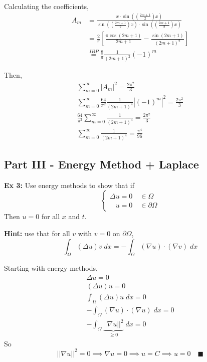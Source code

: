 \documentclass[12pt]{article}
\begin{document}
Calculating the coefficients, 
\begin{align*}
    A_m &= \frac{x \cdot \sin\left(\left(\frac{2m + 1}{2}\right)x\right)}{\sin\left(\left(\frac{2m + 1}{2}\right)x\right) \cdot \sin\left(\left(\frac{2m + 1}{2}\right)x\right)}\\
    &= \frac{2}{\pi}\left[\frac{\pi\cos(2m + 1)}{2m + 1} - \frac{\sin(2m + 1)}{(2m + 1)^2}\right]\\
    &\overset{IBP}{=} \frac{8}{\pi} \frac{1}{(2m + 1)^2}(-1)^m
\end{align*}

Then, 
\begin{gather*}
    \sum_{m=0}^\infty |A_m|^2 = \frac{2\pi^2}{3}\\
    \sum_{m=0}^\infty \frac{64}{\pi^2} \frac{1}{(2m+1)^4} |(-1)^m|^2 = \frac{2\pi^2}{3}\\
    \frac{64}{\pi^2} \sum_{m=0}^\infty \frac{1}{(2m+1)^4} = \frac{2\pi^2}{3}\\
    \boxed{\sum_{m=0}^\infty \frac{1}{(2m+1)^4} = \frac{\pi^4}{96}}
\end{gather*}

\subsection*{Part III - Energy Method + Laplace}
\textbf{Ex 3:} Use energy methods to show that if 
\[\begin{cases*}
    \Delta u = 0 \quad \in \Omega\\
    \; \; \; u = 0 \quad \in \partial \Omega
\end{cases*}\]
Then $u = 0$ for all $x$ and $t$. 

\textbf{Hint:} use that for all $v$ with $v = 0$ on $\partial \Omega$, 
\[\int_\Omega  (\Delta u)v\; dx = -\int_{\Omega} (\nabla u) \cdot (\nabla v)\; dx\]

Starting with energy methods, 
\begin{gather*}
    \Delta u = 0\\
    (\Delta u)u = 0\\
    \int_\Omega (\Delta u) u\; dx = 0\\
    -\int_\Omega (\nabla u) \cdot (\nabla u)\; dx = 0\\
    -\int_\Omega \underbrace{||\nabla u||^2}_{\geq 0}\; dx = 0
\end{gather*}
So 
\[||\nabla u||^2 = 0 \implies \nabla u = 0 \implies u = C \implies u = 0 \quad \blacksquare\]
\end{document}
